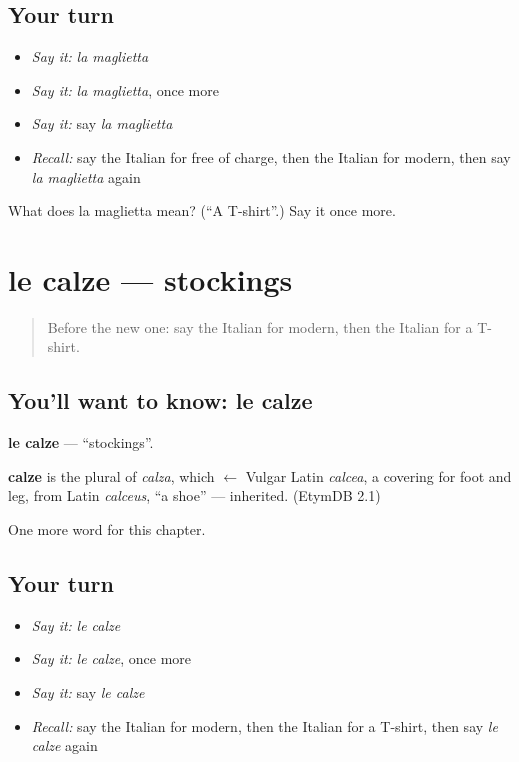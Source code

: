 \subsection*{Your turn}
\begin{itemize}
\raggedright
  \item \emph{Say it:} \emph{la maglietta}
  \item \emph{Say it:} \emph{la maglietta}, once more
  \item \emph{Say it:} say \emph{la maglietta}
  \item \emph{Recall:} say the Italian for free of charge, then the Italian for modern, then say \emph{la maglietta} again
\end{itemize}

\begin{tcolorbox}[breakable,colback=teal!4,colframe=teal!35!black,title={Before you move on}]
What does la maglietta mean? (\textquotedblleft{}A T-shirt\textquotedblright{}.) Say it once more.
\end{tcolorbox}
\section[le calze]{le calze — stockings}

\label{lesson:IT-C220-calze}



\begin{quote}
Before the new one: say the Italian for modern, then the Italian for a T-shirt.
\end{quote}

\subsection*{You'll want to know: le calze}
\textbf{le calze} — \textquotedblleft{}stockings\textquotedblright{}.

\begin{cousinweb}
\textbf{calze} is the plural of \emph{calza}, which $\leftarrow$ Vulgar Latin \emph{calcea}, a covering for foot and leg, from Latin \emph{calceus}, \textquotedblleft{}a shoe\textquotedblright{} — inherited. (EtymDB 2.1)
\end{cousinweb}

\begin{grammarlens}[title={What you've built}]
One more word for this chapter.
\end{grammarlens}

\subsection*{Your turn}
\begin{itemize}
\raggedright
  \item \emph{Say it:} \emph{le calze}
  \item \emph{Say it:} \emph{le calze}, once more
  \item \emph{Say it:} say \emph{le calze}
  \item \emph{Recall:} say the Italian for modern, then the Italian for a T-shirt, then say \emph{le calze} again
\end{itemize}

